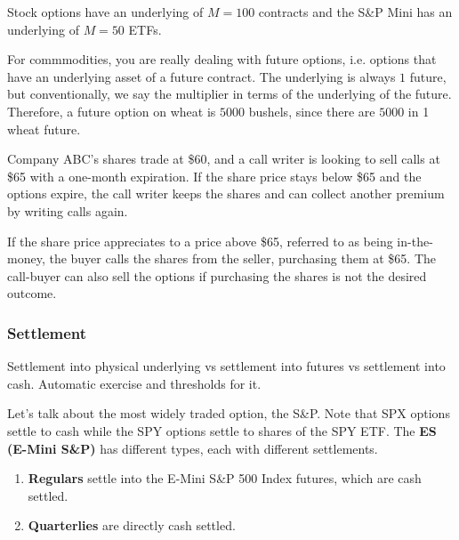 \documentclass{article}
\begin{document}
      \begin{example}
        Stock options have an underlying of $M = 100$ contracts and the S\&P Mini has an underlying of $M = 50$ ETFs. 
      \end{example}

      \begin{example}
        For commmodities, you are really dealing with future options, i.e. options that have an underlying asset of a future contract. The underlying is always $1$ future, but conventionally, we say the multiplier in terms of the underlying of the future. Therefore, a future option on wheat is $5000$ bushels, since there are $5000$ in 1 wheat future. 
      \end{example}

      \begin{example}
        Company ABC's shares trade at \$60, and a call writer is looking to sell calls at \$65 with a one-month expiration. If the share price stays below \$65 and the options expire, the call writer keeps the shares and can collect another premium by writing calls again. 

        If the share price appreciates to a price above \$65, referred to as being in-the-money, the buyer calls the shares from the seller, purchasing them at \$65. The call-buyer can also sell the options if purchasing the shares is not the desired outcome.
      \end{example}

    \subsubsection{Settlement}

      Settlement into physical underlying vs settlement into futures vs settlement into cash. 
      Automatic exercise and thresholds for it. 

      \begin{example}[ES Options]
        Let's talk about the most widely traded option, the S\&P. Note that SPX options settle to cash while the SPY options settle to shares of the SPY ETF. The \textbf{ES (E-Mini S\&P)} has different types, each with different settlements. 
        \begin{enumerate}
          \item \textbf{Regulars} settle into the E-Mini S\&P 500 Index futures, which are cash settled. 
          \item \textbf{Quarterlies} are directly cash settled.  
        \end{enumerate}
      \end{example}
\end{document}
